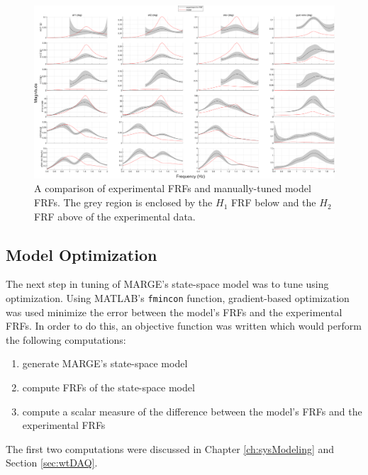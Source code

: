 \begin{landscape}

\begin{figure}[H]
	\centering
	\label{fig:manualTunedFRF}
	\includegraphics[width=9in]{figs/FRFcompare_manualTune_q207.png}
	\caption{A comparison of experimental FRFs and manually-tuned model FRFs. The grey region is enclosed by the $H_1$ FRF below and the $H_2$ FRF above of the experimental data.}
\end{figure}

\end{landscape}

\subsection{Model Optimization} %

The next step in tuning of MARGE's state-space model was to tune using optimization. Using MATLAB's \verb|fmincon| function, gradient-based optimization was used minimize the error between the model's FRFs and the experimental FRFs. In order to do this, an objective function was written which would perform the following computations:
\begin{enumerate}
	\item generate MARGE's state-space model
	\item compute FRFs of the state-space model
	\item compute a scalar measure of the difference between the model's FRFs and the experimental FRFs
\end{enumerate}
The first two computations were discussed in Chapter \ref{ch:sysModeling} and Section \ref{sec:wtDAQ}.

